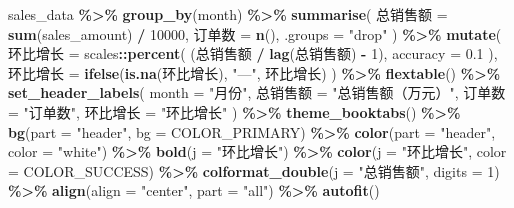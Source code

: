 \documentclass[
]{article}
\newenvironment{Shaded}{\begin{snugshade}}{\end{snugshade}}
\newcommand{\AttributeTok}[1]{\textcolor[rgb]{0.13,0.29,0.53}{#1}}
\newcommand{\DecValTok}[1]{\textcolor[rgb]{0.00,0.00,0.81}{#1}}
\newcommand{\FloatTok}[1]{\textcolor[rgb]{0.00,0.00,0.81}{#1}}
\newcommand{\FunctionTok}[1]{\textcolor[rgb]{0.13,0.29,0.53}{\textbf{#1}}}
\newcommand{\NormalTok}[1]{#1}
\newcommand{\OtherTok}[1]{\textcolor[rgb]{0.56,0.35,0.01}{#1}}
\newcommand{\SpecialCharTok}[1]{\textcolor[rgb]{0.81,0.36,0.00}{\textbf{#1}}}
\newcommand{\StringTok}[1]{\textcolor[rgb]{0.31,0.60,0.02}{#1}}
\begin{document}
\begin{Shaded}
\begin{Highlighting}[]
\NormalTok{sales\_data }\SpecialCharTok{\%\textgreater{}\%}
  \FunctionTok{group\_by}\NormalTok{(month) }\SpecialCharTok{\%\textgreater{}\%}
  \FunctionTok{summarise}\NormalTok{(}
\NormalTok{    总销售额 }\OtherTok{=} \FunctionTok{sum}\NormalTok{(sales\_amount) }\SpecialCharTok{/} \DecValTok{10000}\NormalTok{,}
\NormalTok{    订单数   }\OtherTok{=} \FunctionTok{n}\NormalTok{(),}
    \AttributeTok{.groups  =} \StringTok{"drop"}
\NormalTok{  ) }\SpecialCharTok{\%\textgreater{}\%}
  \FunctionTok{mutate}\NormalTok{(}
\NormalTok{    环比增长 }\OtherTok{=}\NormalTok{ scales}\SpecialCharTok{::}\FunctionTok{percent}\NormalTok{(}
\NormalTok{      (总销售额 }\SpecialCharTok{/} \FunctionTok{lag}\NormalTok{(总销售额) }\SpecialCharTok{{-}} \DecValTok{1}\NormalTok{), }\AttributeTok{accuracy =} \FloatTok{0.1}
\NormalTok{    ),}
\NormalTok{    环比增长 }\OtherTok{=} \FunctionTok{ifelse}\NormalTok{(}\FunctionTok{is.na}\NormalTok{(环比增长), }\StringTok{"—"}\NormalTok{, 环比增长)}
\NormalTok{  ) }\SpecialCharTok{\%\textgreater{}\%}
  \FunctionTok{flextable}\NormalTok{() }\SpecialCharTok{\%\textgreater{}\%}
  \FunctionTok{set\_header\_labels}\NormalTok{(}
    \StringTok{\textasciigrave{}}\AttributeTok{month}\StringTok{\textasciigrave{}}    \OtherTok{=} \StringTok{"月份"}\NormalTok{,}
    \StringTok{\textasciigrave{}}\AttributeTok{总销售额}\StringTok{\textasciigrave{}} \OtherTok{=} \StringTok{"总销售额（万元）"}\NormalTok{,}
    \StringTok{\textasciigrave{}}\AttributeTok{订单数}\StringTok{\textasciigrave{}}   \OtherTok{=} \StringTok{"订单数"}\NormalTok{,}
    \StringTok{\textasciigrave{}}\AttributeTok{环比增长}\StringTok{\textasciigrave{}} \OtherTok{=} \StringTok{"环比增长"}
\NormalTok{  ) }\SpecialCharTok{\%\textgreater{}\%}
  \FunctionTok{theme\_booktabs}\NormalTok{() }\SpecialCharTok{\%\textgreater{}\%}
  \FunctionTok{bg}\NormalTok{(}\AttributeTok{part =} \StringTok{"header"}\NormalTok{, }\AttributeTok{bg =}\NormalTok{ COLOR\_PRIMARY) }\SpecialCharTok{\%\textgreater{}\%}
  \FunctionTok{color}\NormalTok{(}\AttributeTok{part =} \StringTok{"header"}\NormalTok{, }\AttributeTok{color =} \StringTok{"white"}\NormalTok{) }\SpecialCharTok{\%\textgreater{}\%}
  \FunctionTok{bold}\NormalTok{(}\AttributeTok{j =} \StringTok{"环比增长"}\NormalTok{) }\SpecialCharTok{\%\textgreater{}\%}
  \FunctionTok{color}\NormalTok{(}\AttributeTok{j =} \StringTok{"环比增长"}\NormalTok{, }\AttributeTok{color =}\NormalTok{ COLOR\_SUCCESS) }\SpecialCharTok{\%\textgreater{}\%}
  \FunctionTok{colformat\_double}\NormalTok{(}\AttributeTok{j =} \StringTok{"总销售额"}\NormalTok{, }\AttributeTok{digits =} \DecValTok{1}\NormalTok{) }\SpecialCharTok{\%\textgreater{}\%}
  \FunctionTok{align}\NormalTok{(}\AttributeTok{align =} \StringTok{"center"}\NormalTok{, }\AttributeTok{part =} \StringTok{"all"}\NormalTok{) }\SpecialCharTok{\%\textgreater{}\%}
  \FunctionTok{autofit}\NormalTok{()}
\end{Highlighting}
\end{Shaded}
\end{document}

